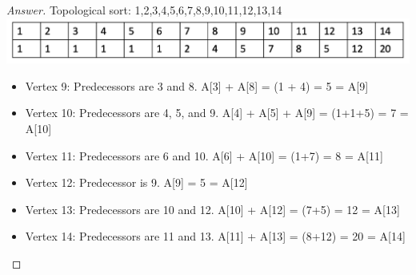 \documentclass[11pt]{article}
\theoremstyle{definition}
\theoremstyle{definition}
\theoremstyle{definition}
\begin{document}
\begin{proof}[Answer]
Topological sort: 1,2,3,4,5,6,7,8,9,10,11,12,13,14  \\
\includegraphics[width = 170mm]{lookup.png} \\
\begin{itemize}
    \item Vertex 9:  Predecessors are 3 and 8. A[3] + A[8] = (1 + 4) = 5 =  A[9]
    \item Vertex 10: Predecessors are 4, 5, and 9. A[4] + A[5] + A[9] = (1+1+5) = 7 = A[10]
    \item Vertex 11: Predecessors are 6 and 10. A[6] + A[10] = (1+7) = 8 = A[11]
    \item Vertex 12: Predecessor is 9. A[9] = 5 = A[12]
    \item Vertex 13: Predecessors are 10 and 12. A[10] + A[12]  = (7+5) = 12 = A[13]
    \item Vertex 14: Predecessors are 11 and 13. A[11] + A[13] = (8+12) = 20 = A[14]
    
\end{itemize}
\end{proof}




\newpage
\end{document}
